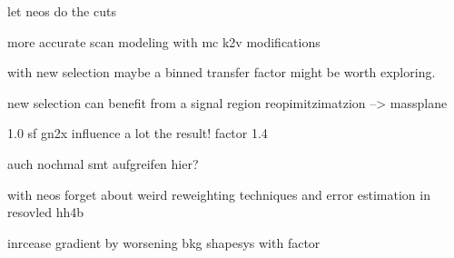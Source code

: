 let neos do the cuts 

more accurate scan modeling with mc k2v modifications 

with new selection maybe a binned transfer factor might be worth exploring.

new selection can benefit from a signal region reopimitzimatzion --> massplane



1.0 sf gn2x influence a lot the result! factor 1.4 


auch nochmal smt aufgreifen hier?


with neos forget about weird reweighting techniques and error estimation in resovled hh4b

inrcease gradient by worsening bkg shapesys with factor
